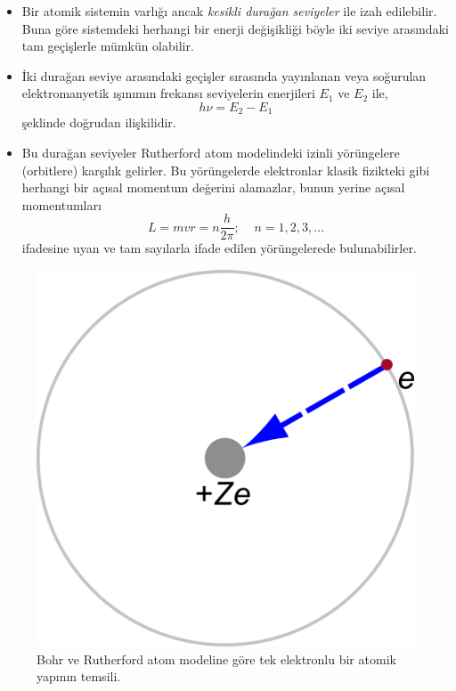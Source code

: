 \documentclass[a4paper,12pt, twoside]{article}
\begin{document}
\begin{itemize}
\item Bir atomik sistemin varlığı ancak {\it kesikli durağan seviyeler} ile izah edilebilir. Buna göre sistemdeki herhangi bir enerji değişikliği böyle iki seviye arasındaki tam geçişlerle mümkün olabilir.

\item İki durağan seviye arasındaki geçişler sırasında yayınlanan veya soğurulan elektromanyetik ışınımın frekansı seviyelerin enerjileri $E_1$ ve $E_2$ ile,
\begin{equation}
h\nu = E_2 - E_1
\label{eq:bohr_states}
\end{equation}
şeklinde doğrudan ilişkilidir.

\item Bu durağan seviyeler Rutherford atom modelindeki izinli yörüngelere (orbitlere) karşılık gelirler. Bu yörüngelerde elektronlar klasik fizikteki gibi herhangi bir açısal momentum değerini alamazlar, bunun yerine açısal momentumları
\begin{equation}
L = m v r  = n \frac{h}{2 \pi}
\label{eq:bohr_allowed_states}; \;\;\;\; n=1,2,3, \dots
\end{equation}
ifadesine uyan ve tam sayılarla ifade edilen yörüngelerede bulunabilirler.
\end{itemize}

\begin{figure}[hbtp]
\center
\includegraphics[scale=.8]{Bohr-atom-PAR.png}
\caption{Bohr ve Rutherford atom modeline göre tek elektronlu bir atomik yapının temsili.}
\label{fig:bohr_atom}
\end{figure}
\end{document}
